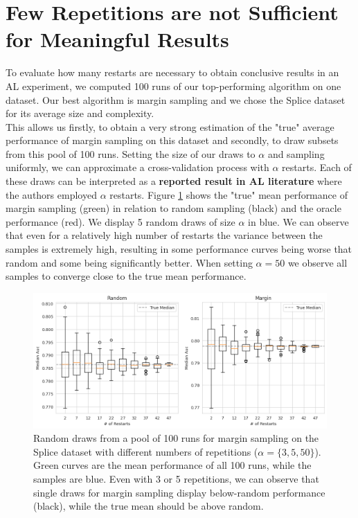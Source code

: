 \documentclass[]{article}
\begin{document}
\section{Few Repetitions are not Sufficient for Meaningful Results}\label{sec:restarts}
To evaluate how many restarts are necessary to obtain conclusive results in an AL experiment, we computed 100 runs of our top-performing algorithm on one dataset.
Our best algorithm is margin sampling and we chose the Splice dataset for its average size and complexity. \\
This allows us firstly, to obtain a very strong estimation of the "true" average performance of margin sampling on this dataset and secondly, to draw subsets from this pool of 100 runs.
Setting the size of our draws to $\alpha$ and sampling uniformly, we can approximate a cross-validation process with $\alpha$ restarts.
Each of these draws can be interpreted as a \textbf{reported result in AL literature} where the authors employed $\alpha$ restarts.
Figure \ref{fig:restarts} shows the "true" mean performance of margin sampling (green) in relation to random sampling (black) and the oracle performance (red).
We display 5 random draws of size $\alpha$ in blue.
We can observe that even for a relatively high number of restarts the variance between the samples is extremely high, resulting in some performance curves being worse that random and some being significantly better.
When setting $\alpha = 50$ we observe all samples to converge close to the true mean performance. 
\begin{figure}
        \hspace{-20mm}
	\includegraphics[width=1.24\linewidth]{img/ablation_restarts}
	\caption{Random draws from a pool of 100 runs for margin sampling on the Splice dataset with different numbers of repetitions ($\alpha=\{3,5,50\}$). Green curves are the mean performance of all 100 runs, while the samples are blue. Even with 3 or 5 repetitions, we can observe that single draws for margin sampling display below-random performance (black), while the true mean should be above random.}
	\label{fig:restarts}
\end{figure}
\end{document}
